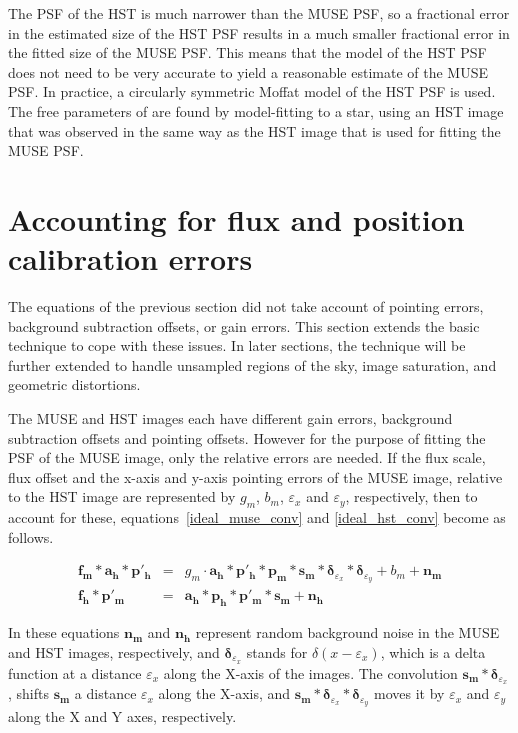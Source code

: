 \documentclass[12pt,twoside,a4paper]{article}
\newcommand{\msky}{\mathbf{s_m}}
\newcommand{\mpsf}{\mathbf{p_m}}
\newcommand{\hpsf}{\mathbf{p_h}}
\newcommand{\mepsf}{\mathbf{p'_m}}
\newcommand{\hepsf}{\mathbf{p'_h}}
\newcommand{\hlpf}{\mathbf{a_h}}
\newcommand{\mimg}{\mathbf{f_m}}
\newcommand{\himg}{\mathbf{f_h}}
\newcommand{\mnoise}{\mathbf{n_m}}
\newcommand{\hnoise}{\mathbf{n_h}}
\newcommand{\mdx}{\bm{\delta}_{\dx}}
\newcommand{\mdy}{\bm{\delta}_{\dy}}
\newcommand{\dx}{\varepsilon_x}
\newcommand{\dy}{\varepsilon_y}
\newcommand{\mgain}{g_m}
\newcommand{\mbg}{b_m}
\begin{document}
The PSF of the HST is much narrower than the MUSE PSF, so a fractional
error in the estimated size of the HST PSF results in a much smaller
fractional error in the fitted size of the MUSE PSF. This means that
the model of the HST PSF does not need to be very accurate to yield a
reasonable estimate of the MUSE PSF. In practice, a circularly
symmetric Moffat model of the HST PSF is used. The free parameters of
are found by model-fitting to a star, using an HST image that was
observed in the same way as the HST image that is used for fitting the
MUSE PSF.

\section{Accounting for flux and position calibration errors}

The equations of the previous section did not take account of pointing
errors, background subtraction offsets, or gain errors. This section
extends the basic technique to cope with these issues. In later
sections, the technique will be further extended to handle unsampled
regions of the sky, image saturation, and geometric distortions.

The MUSE and HST images each have different gain errors, background
subtraction offsets and pointing offsets. However for the purpose of
fitting the PSF of the MUSE image, only the relative errors are
needed. If the flux scale, flux offset and the x-axis and y-axis
pointing errors of the MUSE image, relative to the HST image are
represented by $\mgain$, $\mbg$, $\dx$ and $\dy$, respectively, then
to account for these, equations~\ref{ideal_muse_conv} and
\ref{ideal_hst_conv} become as follows.

\begin{eqnarray}
\label{muse_cal_eqn}
\mimg \ast \hlpf \ast \hepsf &=& \mgain
\cdot \hlpf \ast \hepsf \ast \mpsf \ast \msky \ast \mdx \ast \mdy +
\mbg+\mnoise\\
\label{hst_ref_eqn}
\himg \ast \mepsf &=& \hlpf \ast \hpsf \ast \mepsf \ast \msky + \hnoise
\end{eqnarray}

In these equations $\mnoise$ and $\hnoise$ represent random background
noise in the MUSE and HST images, respectively, and $\mdx$ stands for
$\delta(x-\dx)$, which is a delta function at a distance $\dx$ along
the X-axis of the images. The convolution $\msky\ast\mdx$, shifts
$\msky$ a distance $\dx$ along the X-axis, and
$\msky\ast\mdx\ast\mdy$ moves it by $\dx$ and $\dy$ along the X and Y
axes, respectively.
\end{document}
